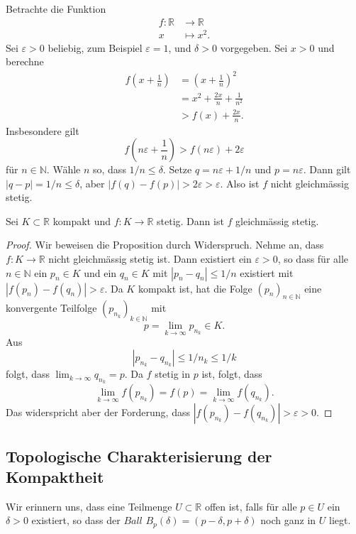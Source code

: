 \documentclass[../main.tex]{subfiles}
\begin{document}
\begin{example}
  Betrachte die Funktion
  \begin{align*}
    f \colon \mathbb{R} & \to \mathbb{R} \\
    x & \mapsto x^2.
  \end{align*}
  Sei $\varepsilon > 0$ beliebig,
  zum Beispiel $\varepsilon = 1$, und $\delta > 0$ vorgegeben.  
  Sei $x > 0$ und berechne
  \begin{align*}
    f\left(x + \frac{1}{n}\right) 
    & = {\left(x + \frac{1}{n}\right)}^2 \\
               & = x^2 + \frac{2x}{n} + \frac{1}{n^2} \\
               & > f(x) + \frac{2x}{n}.
  \end{align*}
  Insbesondere gilt
  \[
  f\left(n \varepsilon + \frac{1}{n}\right)
  > f(n \varepsilon) + 2 \varepsilon
  \]
  für $n \in \mathbb{N}$. Wähle
  $n$ so, dass $1/n \leq \delta$.
  Setze $q = n\varepsilon + 1/n$ 
  und $p = n\varepsilon$.
  Dann gilt $|q - p| = 1/n \leq \delta$,
  aber
  $|f(q) - f(p)| > 2 \varepsilon > \varepsilon$.
  Also ist $f$ nicht gleichmässig stetig.
\end{example}

\begin{proposition}
  Sei $K \subset \mathbb{R}$ kompakt
  und $f \colon K \to \mathbb{R}$ stetig.
  Dann ist $f$ gleichmässig stetig.
\end{proposition}

\begin{proof}
  Wir beweisen die Proposition durch Widerspruch.
  Nehme an, dass $f \colon K \to \mathbb{R}$ nicht
  gleichmässig stetig ist.
  Dann existiert ein $\varepsilon > 0$,
  so dass für alle $n \in \mathbb{N}$ 
  ein $p_n \in K$ und ein $q_n \in K$ mit
  $|p_n - q_n| \leq 1/n$ existiert
  mit $
    |f(p_n) - f(q_n)| > \varepsilon$.
  Da $K$ kompakt ist,
  hat die Folge ${(p_{n})}_{n \in \mathbb{N}}$ 
  eine konvergente Teilfolge
  ${(p_{n_k})}_{k \in \mathbb{N}}$ 
  mit
  \[
    p = \lim_{k \to \infty}p_{n_k} \in K.
  \]
  Aus
  \[
    |p_{n_k} - q_{n_k}| \leq 1/n_k \leq 1/k
  \]
  folgt, dass
  $
    \lim_{k \to \infty} q_{n_k} = p
    $.
  Da $f$ stetig in $p$ ist, folgt, dass
  \[
    \lim_{k \to \infty} f(p_{n_k}) 
    = f(p) 
    = \lim_{k \to \infty} f(q_{n_k}).
  \]
  Das widerspricht aber der Forderung,
  dass $|f(p_{n_k}) - f(q_{n_k})| > \varepsilon > 0$.
\end{proof}

\subsection*{Topologische Charakterisierung
der Kompaktheit}
Wir erinnern uns, dass eine Teilmenge
$U \subset \mathbb{R}$ offen ist,
falls für alle
$p \in U$ ein $\delta > 0$ existiert,
so dass der $\textit{Ball}$ 
$B_p(\delta) = (p- \delta, p + \delta)$
noch ganz in $U$ liegt.
\end{document}
